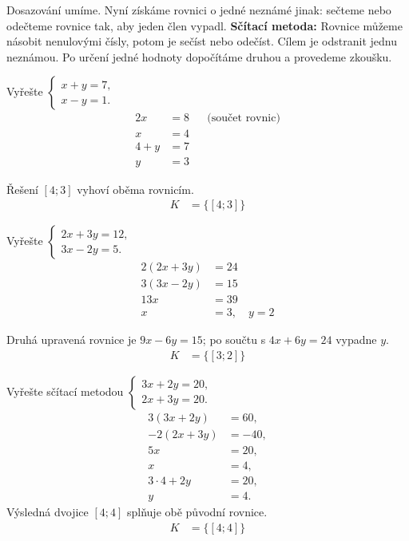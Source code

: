 \documentclass[11pt,a4paper]{article}
\begin{document}
Dosazování umíme. Nyní získáme rovnici o jedné neznámé jinak: sečteme nebo odečteme rovnice tak, aby jeden člen vypadl.
\textbf{Sčítací metoda:} Rovnice můžeme násobit nenulovými čísly, potom je sečíst nebo odečíst. Cílem je odstranit jednu neznámou. Po určení jedné hodnoty dopočítáme druhou a provedeme zkoušku.
\begin{prikladReseniBox}[title={Příklad 1}]
Vyřešte $\begin{cases}x+y=7,\\x-y=1.\end{cases}$
\tcblower
\[
\begin{aligned}
2x&=8 &&\text{(součet rovnic)} \\
 x&=4 \\
 4+y&=7 \\
 y&=3
\end{aligned}
\]

Řešení $[4;3]$ vyhoví oběma rovnicím.
\[
\begin{aligned}
K &= \{[4;3]\}
\end{aligned}
\]
\end{prikladReseniBox}
\begin{prikladReseniBox}[title={Příklad 2}]
Vyřešte $\begin{cases}2x+3y=12,\\3x-2y=5.\end{cases}$
\tcblower
\[
\begin{aligned}
2(2x+3y)&=24 \\
 3(3x-2y)&=15 \\
 13x&=39 \\
 x&=3,\quad y=2
\end{aligned}
\]

Druhá upravená rovnice je $9x-6y=15$; po součtu s $4x+6y=24$ vypadne $y$.
\[
\begin{aligned}
K &= \{[3;2]\}
\end{aligned}
\]
\end{prikladReseniBox}
\begin{prikladReseniBox}[title={Příklad 3}]
Vyřešte sčítací metodou $\begin{cases}3x+2y=20,\\2x+3y=20.\end{cases}$
\tcblower
\[
\begin{aligned}
3(3x+2y)&=60,\\
-2(2x+3y)&=-40,\\
5x&=20,\\
x&=4,\\
3\cdot4+2y&=20,\\
y&=4.
\end{aligned}
\]
Výsledná dvojice $[4;4]$ splňuje obě původní rovnice.
\[
\begin{aligned}
K &= \{[4;4]\}
\end{aligned}
\]
\end{prikladReseniBox}
\end{document}
